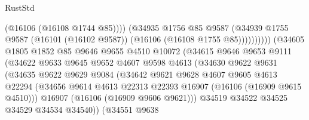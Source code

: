 \begin{lexlean}{RustStd}
\begin{coremodule}
                                          (@16106 (@16108 @1744 @85))))
                                      (@34935
                                        @1756
                                        @85
                                        @9587
                                        (@34939
                                          @1755
                                          @9587
                                          (@16101 (@16102 @9587))
                                          (@16106 (@16108 @1755 @85))))))))))
                          (@34605
                            @1805
                            @1852
                            @85
                            @9646
                            @9655
                            @4510
                            @10072
                            (@34615
                              @9646
                              @9653
                              @9111
                              (@34622
                                @9633
                                @9645
                                @9652
                                @4607
                                @9598
                                @4613
                                (@34630
                                  @9622
                                  @9631
                                  (@34635
                                    @9622
                                    @9629
                                    @9084
                                    (@34642
                                      @9621
                                      @9628
                                      @4607
                                      @9605
                                      @4613
                                      @22294
                                      (@34656
                                        @9614
                                        @4613
                                        @22313
                                        @22393
                                        @16907
                                        (@16106 (@16909 @9615 @4510)))
                                      @16907
                                      (@16106 (@16909 @9606 @9621)))
                                    @34519
                                    @34522
                                    @34525
                                    @34529
                                    @34534
                                    @34540))
                                (@34551
                                  @9638

\end{coremodule}
\end{lexlean}

